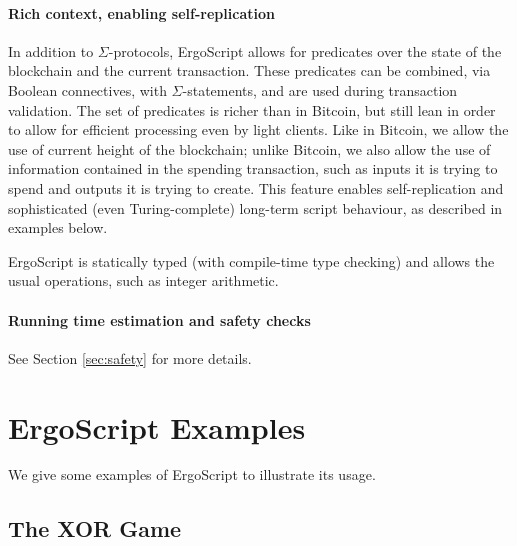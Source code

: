 \documentclass[11pt]{article}
\newcommand{\authnote}[2]{\marginpar{\parbox{\marginparwidth}{\tiny %
  \textsf{#1 {\textcolor{blue}{notes: #2}}}}}%
  \textcolor{blue}{\textbf{\dag}}}
\newcommand{\authnote}[2]{
  \textsf{#1 \textcolor{blue}{: #2}}}
\newcommand{\authnote}[2]{}
\newcommand{\lnote}[1]{{\authnote{\textcolor{orange}{Leo notes}}{#1}}}
\newcommand{\snote}[1]{{\authnote{\textcolor{yellow}{Scalahub notes}}{#1}}}
\newcommand{\langname}{ErgoScript\xspace}
\newcommand{\tnode}{\ensuremath{\mathsf{THRESHOLD}}}
\begin{document}

\paragraph{Rich context, enabling self-replication}
In addition to $\Sigma$-protocols, \langname allows for predicates over the state of the blockchain and the current transaction. These predicates can be combined, via Boolean connectives, with $\Sigma$-statements, and are used during transaction validation. The set of predicates is richer than in Bitcoin, but still lean in order to allow for efficient processing even by light clients. Like in Bitcoin, we allow the use of current height of the blockchain; unlike Bitcoin, we also allow the use of information contained in the spending transaction, such as inputs it is trying to spend and outputs it is trying to create. This feature enables self-replication and sophisticated (even Turing-complete) long-term script behaviour, as described in examples below.

\langname is statically typed (with compile-time type checking) and allows the usual operations, such as integer arithmetic.

\snote{This seems incomplete. In particular, we should describe all context variables and operations allowed, possibly using BNF or some grammar.}


\paragraph{Running time estimation and safety checks}
\lnote{someone should fill this in, because I know very little about it}
See Section \ref{sec:safety} for more details.

\section{\langname Examples}

We give some examples of \langname to illustrate its usage. 
\subsection{The XOR Game}
\end{document}

